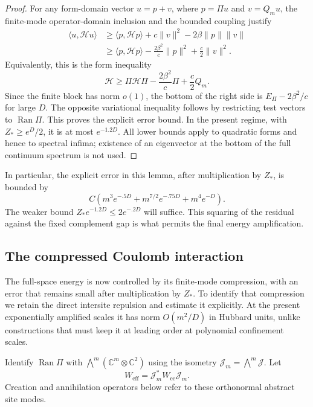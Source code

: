 \begin{proof}
For any form-domain vector \(u=p+v\), where \(p=\Pi u\)
and \(v=Q_m u\), the finite-mode operator-domain inclusion and
the bounded coupling justify
\begin{align*}
 \langle u,\mathcal H u\rangle
 &\ge\langle p,\mathcal H p\rangle
       +c\|v\|^2-2\beta\|p\|\|v\|\\
 &\ge\langle p,\mathcal H p\rangle
       -\frac{2\beta^2}{c}\|p\|^2+\frac c2\|v\|^2.
\end{align*}
Equivalently, this is the form inequality
\[
 \mathcal H\ge
 \Pi\mathcal H\Pi-\frac{2\beta^2}{c}\Pi+\frac c2Q_m.
\]
Since the finite block has norm \(o(1)\), the bottom of the
right side is \(E_\Pi-2\beta^2/c\) for large \(D\).
The opposite variational inequality follows by restricting
test vectors to \(\operatorname{Ran}\Pi\).
This proves the explicit error bound.  In the present regime,
with \(Z_*\ge e^D/2\), it is at most \(e^{-1.2D}\).
All lower bounds apply to quadratic forms and hence to spectral
infima; existence of an eigenvector at the bottom of the full
continuum spectrum is not used.
\end{proof}

In particular, the explicit error in this lemma, after
multiplication by \(Z_*\), is bounded by
\begin{equation}
 C\left(
    m^3e^{-.5D}+m^{7/2}e^{-.75D}+m^4e^{-D}
 \right).
 \label{eq:continuum-leakage-final-units}
\end{equation}
The weaker bound \(Z_*e^{-1.2D}\le2e^{-.2D}\) will suffice.
This squaring of the residual against the fixed complement gap
is what permits the final energy amplification.

\subsection{The compressed Coulomb interaction}

The full-space energy is now controlled by its finite-mode compression,
with an error that remains small after multiplication by $Z_*$. To
identify that compression we retain the direct intersite repulsion and
estimate it explicitly. At the present exponentially amplified scales it
has norm $O(m^2/D)$ in Hubbard units, unlike constructions that must keep
it at leading order at polynomial confinement scales.

Identify \(\operatorname{Ran}\Pi\) with
\(\bigwedge^m(\mathbb C^m\otimes\mathbb C^2)\) using the
isometry \(\mathcal J_m=\bigwedge^m\mathcal J\).
Let
\[
 W_{\mathrm{eff}}=\mathcal J_m^*W_{\mathrm{ee}}\mathcal J_m.
\]
Creation and annihilation operators below refer to these
orthonormal abstract site modes.

